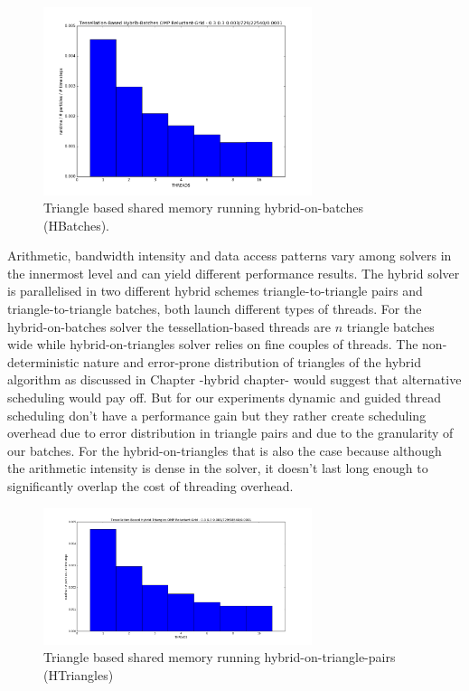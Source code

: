 \documentclass[times,12pt]{article}
\begin{document}
\begin{figure}[htb]
  \begin{center}
    \includegraphics[width=0.7\textwidth]{experiments/omp/hbatches_omp_triangles_200.png}
  \end{center}
  \caption{Triangle based shared memory running hybrid-on-batches (HBatches).}
  \label{figure:hbatches_triangles_triangle_omp}
\end{figure}

Arithmetic, bandwidth intensity and data access patterns vary among solvers in the innermost level and can yield different performance results. The hybrid solver is parallelised in two different hybrid schemes triangle-to-triangle pairs and triangle-to-triangle batches, both launch different types of threads. For the hybrid-on-batches solver the tessellation-based threads
are $n$ triangle batches wide while hybrid-on-triangles solver relies on fine couples of threads. The non-deterministic nature and error-prone distribution of triangles of the hybrid algorithm as discussed in Chapter {-hybrid chapter-} would suggest that alternative scheduling would pay off. But for our experiments dynamic and guided thread scheduling don't have a performance gain but they rather create scheduling overhead due to error distribution in triangle pairs and due to the granularity of our batches. For the hybrid-on-triangles that is also the case because although the arithmetic intensity is dense in the solver, it doesn't last long enough to significantly overlap the cost of threading overhead. 

\begin{figure}[htb]
  \begin{center}
    \includegraphics[width=0.7\textwidth]{experiments/omp/htriangle_omp_triangles_200.png}
  \end{center}
  \caption{Triangle based shared memory running hybrid-on-triangle-pairs (HTriangles)}
  \label{figure:htriangles_triangles_triangle_omp}
\end{figure}
\end{document}
